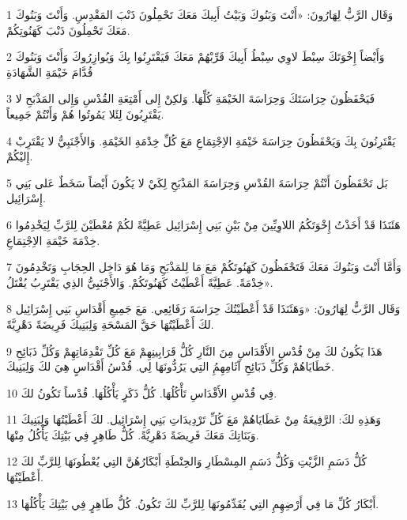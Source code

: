 \par 1 وَقَال الرَّبُّ لِهَارُونَ: «أَنْتَ وَبَنُوكَ وَبَيْتُ أَبِيكَ مَعَكَ تَحْمِلُونَ ذَنْبَ المَقْدِسِ. وَأَنْتَ وَبَنُوكَ مَعَكَ تَحْمِلُونَ ذَنْبَ كَهَنُوتِكُمْ.
\par 2 وَأَيْضاً إِخْوَتَكَ سِبْطَ لاوِي سِبْطُ أَبِيكَ قَرِّبْهُمْ مَعَكَ فَيَقْتَرِنُوا بِكَ وَيُوازِرُوكَ وَأَنْتَ وَبَنُوكَ قُدَّامَ خَيْمَةِ الشَّهَادَةِ
\par 3 فَيَحْفَظُونَ حِرَاسَتَكَ وَحِرَاسَةَ الخَيْمَةِ كُلِّهَا. وَلكِنْ إِلى أَمْتِعَةِ القُدْسِ وَإِلى المَذْبَحِ لا يَقْتَرِبُونَ لِئَلا يَمُوتُوا هُمْ وَأَنْتُمْ جَمِيعاً.
\par 4 يَقْتَرِنُونَ بِكَ وَيَحْفَظُونَ حِرَاسَةَ خَيْمَةِ الاِجْتِمَاعِ مَعَ كُلِّ خِدْمَةِ الخَيْمَةِ. وَالأَجْنَبِيُّ لا يَقْتَرِبْ إِليْكُمْ.
\par 5 بَل تَحْفَظُونَ أَنْتُمْ حِرَاسَةَ القُدْسِ وَحِرَاسَةَ المَذْبَحِ لِكَيْ لا يَكُونَ أَيْضاً سَخَطٌ عَلى بَنِي إِسْرَائِيل.
\par 6 هَئَنَذَا قَدْ أَخَذْتُ إِخْوَتَكُمُ اللاوِيِّينَ مِنْ بَيْنِ بَنِي إِسْرَائِيل عَطِيَّةً لكُمْ مُعْطَيْنَ لِلرَّبِّ لِيَخْدِمُوا خِدْمَةَ خَيْمَةِ الاِجْتِمَاعِ.
\par 7 وَأَمَّا أَنْتَ وَبَنُوكَ مَعَكَ فَتَحْفَظُونَ كَهَنُوتَكُمْ مَعَ مَا لِلمَذْبَحِ وَمَا هُوَ دَاخِل الحِجَابِ وَتَخْدِمُونَ خِدْمَةً. عَطِيَّةً أَعْطَيْتُ كَهَنُوتَكُمْ. وَالأَجْنَبِيُّ الذِي يَقْتَرِبُ يُقْتَلُ».
\par 8 وَقَال الرَّبُّ لِهَارُونَ: «وَهَئَنَذَا قَدْ أَعْطَيْتُكَ حِرَاسَةَ رَفَائِعِي. مَعَ جَمِيعِ أَقْدَاسِ بَنِي إِسْرَائِيل لكَ أَعْطَيْتُهَا حَقَّ المَسْحَةِ وَلِبَنِيكَ فَرِيضَةً دَهْرِيَّةً.
\par 9 هَذَا يَكُونُ لكَ مِنْ قُدْسِ الأَقْدَاسِ مِنَ النَّارِ كُلُّ قَرَابِينِهِمْ مَعَ كُلِّ تَقْدِمَاتِهِمْ وَكُلِّ ذَبَائِحِ خَطَايَاهُمْ وَكُلِّ ذَبَائِحِ آثَامِهِمُِ التِي يَرُدُّونَهَا لِي. قُدْسُ أَقْدَاسٍ هِيَ لكَ وَلِبَنِيكَ.
\par 10 فِي قُدْسِ الأَقْدَاسِ تَأْكُلُهَا. كُلُّ ذَكَرٍ يَأْكُلُهَا. قُدْساً تَكُونُ لكَ.
\par 11 وَهَذِهِ لكَ: الرَّفِيعَةُ مِنْ عَطَايَاهُمْ مَعَ كُلِّ تَرْدِيدَاتِ بَنِي إِسْرَائِيل. لكَ أَعْطَيْتُهَا وَلِبَنِيكَ وَبَنَاتِكَ مَعَكَ فَرِيضَةً دَهْرِيَّةً. كُلُّ طَاهِرٍ فِي بَيْتِكَ يَأْكُلُ مِنْهَا.
\par 12 كُلُّ دَسَمِ الزَّيْتِ وَكُلُّ دَسَمِ المِسْطَارِ وَالحِنْطَةِ أَبْكَارُهُنَّ التِي يُعْطُونَهَا لِلرَّبِّ لكَ أَعْطَيْتُهَا.
\par 13 أَبْكَارُ كُلِّ مَا فِي أَرْضِهِمِ التِي يُقَدِّمُونَهَا لِلرَّبِّ لكَ تَكُونُ. كُلُّ طَاهِرٍ فِي بَيْتِكَ يَأْكُلُهَا.

